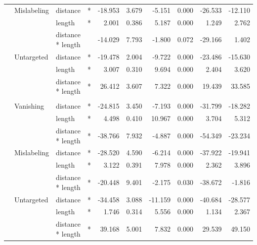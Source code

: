 \documentclass[
]{article}
\begin{document}
\begin{longtable}[t]{llllrrrrrr}
\hspace{1em} & Mislabeling & distance & * & -18.953 & 3.679 & -5.151 & 0.000 & -26.533 & -12.110\\
\cmidrule{3-10}\nopagebreak
\hspace{1em} &  & length & * & 2.001 & 0.386 & 5.187 & 0.000 & 1.249 & 2.762\\
\cmidrule{3-10}\nopagebreak
\hspace{1em} &  & distance * length &  & -14.029 & 7.793 & -1.800 & 0.072 & -29.166 & 1.402\\
\cmidrule{2-10}\nopagebreak
\hspace{1em} & Untargeted & distance & * & -19.478 & 2.004 & -9.722 & 0.000 & -23.486 & -15.630\\
\cmidrule{3-10}\nopagebreak
\hspace{1em} &  & length & * & 3.007 & 0.310 & 9.694 & 0.000 & 2.404 & 3.620\\
\cmidrule{3-10}\nopagebreak
\hspace{1em} &  & distance * length & * & 26.412 & 3.607 & 7.322 & 0.000 & 19.439 & 33.585\\
\cmidrule{1-10}\pagebreak[0]
\addlinespace[0.3em]
\multicolumn{10}{l}{\textbf{Cascade R-CNN}}\\
\hspace{1em} & Vanishing & distance & * & -24.815 & 3.450 & -7.193 & 0.000 & -31.799 & -18.282\\
\cmidrule{3-10}\nopagebreak
\hspace{1em} &  & length & * & 4.498 & 0.410 & 10.967 & 0.000 & 3.704 & 5.312\\
\cmidrule{3-10}\nopagebreak
\hspace{1em} &  & distance * length & * & -38.766 & 7.932 & -4.887 & 0.000 & -54.349 & -23.234\\
\cmidrule{2-10}\nopagebreak
\hspace{1em} & Mislabeling & distance & * & -28.520 & 4.590 & -6.214 & 0.000 & -37.922 & -19.941\\
\cmidrule{3-10}\nopagebreak
\hspace{1em} &  & length & * & 3.122 & 0.391 & 7.978 & 0.000 & 2.362 & 3.896\\
\cmidrule{3-10}\nopagebreak
\hspace{1em} &  & distance * length & * & -20.448 & 9.401 & -2.175 & 0.030 & -38.672 & -1.816\\
\cmidrule{2-10}\nopagebreak
\hspace{1em} & Untargeted & distance & * & -34.458 & 3.088 & -11.159 & 0.000 & -40.684 & -28.577\\
\cmidrule{3-10}\nopagebreak
\hspace{1em} &  & length & * & 1.746 & 0.314 & 5.556 & 0.000 & 1.134 & 2.367\\
\cmidrule{3-10}\nopagebreak
\hspace{1em} &  & distance * length & * & 39.168 & 5.001 & 7.832 & 0.000 & 29.539 & 49.150\\
\bottomrule
\end{longtable}
\endgroup{}
\end{document}
